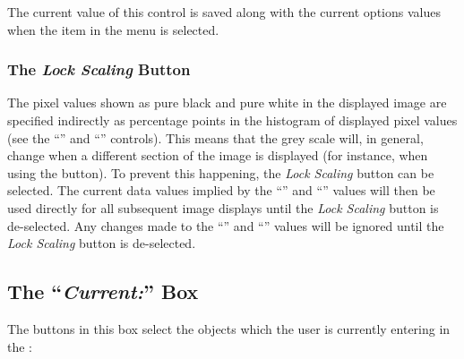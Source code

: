 The current value of this control is saved along with the current options
values when the  item in
the  menu is selected.

\subsubsection {The {\em Lock Scaling} Button}
The pixel values shown as pure black and pure white in the displayed
image are specified indirectly as percentage points in the histogram of
displayed pixel values (see the ``'' and ``''
controls). This means that the grey scale will, in general, change when a
different section of the image is displayed (for instance, when using the
 button). To prevent this happening, the
{\em Lock Scaling} button can be selected. The current data values
implied by the ``'' and
``'' values will then be used
directly for all subsequent image displays until the {\em Lock Scaling}
button is de-selected. Any changes made to the ``'' and ``''
values will be ignored until the {\em Lock Scaling} button is
de-selected.

\subsection {The ``{\em Current:}'' Box}
The buttons in this box select the objects which the user is currently
entering in the :

